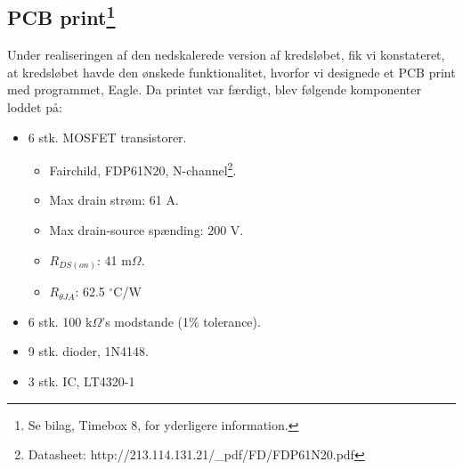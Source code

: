 



\subsection[PDB print]{PCB print\protect\footnote{Se bilag, Timebox 8, for yderligere information.}}
\label{sec:pcb-printf-bilag}

Under realiseringen af den nedskalerede version af kredsløbet, fik vi konstateret, at kredsløbet havde den ønskede funktionalitet, hvorfor vi designede et PCB print med programmet, Eagle. Da printet var færdigt, blev følgende komponenter loddet på:

\begin{itemize}
\item 6 stk. MOSFET transistorer.
  \begin{itemize}
  \item Fairchild, FDP61N20, N-channel\footnote{Datasheet: http://213.114.131.21/_pdf/FD/FDP61N20.pdf}.
  \item Max drain strøm: 61 A.
  \item Max drain-source spænding: 200 V.
  \item $R_{DS(on)}$: 41 m$\Omega$.
  \item $R_{\theta JA}$: 62.5 $^\circ$C/W
\end{itemize}
\item 6 stk. 100 k$\Omega$’s modstande (1\% tolerance).
\item 9 stk. dioder, 1N4148.
\item 3 stk. IC, LT4320-1 
\end{itemize}

